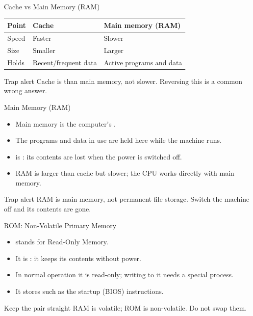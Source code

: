 \documentclass[aspectratio=169]{beamer}
\begin{document}
\begin{frame}{Cache vs Main Memory (RAM)}
  \begin{center}
    \begin{tabular}{lll}
      \toprule
      \textbf{Point} & \textbf{Cache} & \textbf{Main memory (RAM)} \\
      \midrule
      Speed & Faster & Slower \\
      Size & Smaller & Larger \\
      Holds & Recent/frequent data & Active programs and data \\
      \bottomrule
    \end{tabular}
  \end{center}
  \vspace{0.35cm}
  \begin{alertblock}{Trap alert}
    Cache is  than main memory, not slower. Reversing this is a
    common wrong answer.
  \end{alertblock}
\end{frame}

\begin{frame}{Main Memory (RAM)}
  \begin{itemize}
    \item Main memory is the computer's .
    \item The programs and data in use are held here while the machine runs.
    \item {} is : its contents are lost when the power
      is switched off.
    \item RAM is larger than cache but slower; the CPU works directly with
      main memory.
  \end{itemize}
  \begin{alertblock}{Trap alert}
    RAM is main memory, not permanent file storage. Switch the machine off
    and its contents are gone.
  \end{alertblock}
\end{frame}

\begin{frame}{ROM: Non-Volatile Primary Memory}
  \begin{itemize}
    \item {} stands for Read-Only Memory.
    \item It is : it keeps its contents without power.
    \item In normal operation it is read-only; writing to it needs a special
      process.
    \item It stores  such as the startup (BIOS) instructions.
  \end{itemize}
  \begin{block}{Keep the pair straight}
    RAM is volatile; ROM is non-volatile. Do not swap them.
  \end{block}
\end{frame}
\end{document}
